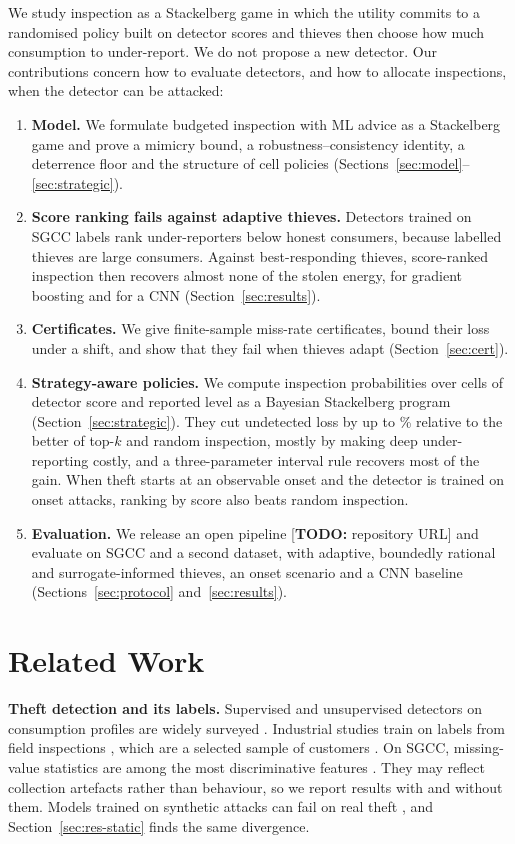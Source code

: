 \documentclass[journal]{IEEEtran}
\newcommand{\todo}[1]{{\color{red}[\textbf{TODO:} #1]}}
\begin{document}
We study inspection as a Stackelberg game in which the utility commits to a randomised policy built on detector scores and thieves then choose how much consumption to under-report. We do not propose a new detector. Our contributions concern how to evaluate detectors, and how to allocate inspections, when the detector can be attacked:
\begin{enumerate}
\item \textbf{Model.} We formulate budgeted inspection with ML advice as a Stackelberg game and prove a mimicry bound, a robustness--consistency identity, a deterrence floor and the structure of cell policies (Sections~\ref{sec:model}--\ref{sec:strategic}).
\item \textbf{Score ranking fails against adaptive thieves.} Detectors trained on SGCC labels rank under-reporters below honest consumers, because labelled thieves are large consumers. Against best-responding thieves, score-ranked inspection then recovers almost none of the stolen energy, for gradient boosting and for a CNN (Section~\ref{sec:results}).
\item \textbf{Certificates.} We give finite-sample miss-rate certificates, bound their loss under a shift, and show that they fail when thieves adapt (Section~\ref{sec:cert}).
\item \textbf{Strategy-aware policies.} We compute inspection probabilities over cells of detector score and reported level as a Bayesian Stackelberg program (Section~\ref{sec:strategic}). They cut undetected loss by up to \rSeGainRelMaxSOne\% relative to the better of top-$k$ and random inspection, mostly by making deep under-reporting costly, and a three-parameter interval rule recovers most of the gain. When theft starts at an observable onset and the detector is trained on onset attacks, ranking by score also beats random inspection.
\item \textbf{Evaluation.} We release an open pipeline \todo{repository URL} and evaluate on SGCC and a second dataset, with adaptive, boundedly rational and surrogate-informed thieves, an onset scenario and a CNN baseline (Sections~\ref{sec:protocol} and~\ref{sec:results}).
\end{enumerate}

\section{Related Work}
\textbf{Theft detection and its labels.} Supervised and unsupervised detectors on consumption profiles are widely surveyed \cite{nagi2010,jokar2016,zheng2018}. Industrial studies train on labels from field inspections \cite{buzau2019}, which are a selected sample of customers \cite{glauner2017big,glauner2018bias}. On SGCC, missing-value statistics are among the most discriminative features \cite{alfian2026,fei2022}. They may reflect collection artefacts rather than behaviour, so we report results with and without them. Models trained on synthetic attacks can fail on real theft \cite{altamimi2025}, and Section~\ref{sec:res-static} finds the same divergence.
\end{document}
